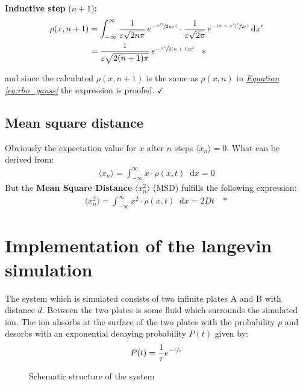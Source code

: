\documentclass[a4paper, parskip=half]{scrartcl}
\newcommand{\effect}[1]{%
	\textbf{#1}%
}
\newcommand{\diff}{\mathop{}\!\mathrm{d}}
\newcommand{\myEqRef}[1]{\textit{\hyperref[eq:#1]{Equation \ref*{eq:#1}}}}
\newcommand{\myEqLabel}[1]{\label{eq:#1}}
\newcommand{\myEqAnnex}[1]{\;\;\;\ast \myEqLabel{#1}}
\begin{document}
\textbf{Inductive step} ($n + 1$)\textbf{:}
\begin{align}
\rho(x,n+1) &= \int_{-\infty}^\infty \frac{1}{\varepsilon\sqrt{2n\pi}}\, e^{-\sfrac{x'^2}{2n\varepsilon^2}} \cdot \frac{1}{\varepsilon\sqrt{2\pi}}\, e^{-\sfrac{(x - x')^2}{2\varepsilon^2}} \diff x'\\
&= \frac{1}{\varepsilon\sqrt{2(n+1)\pi}}\, e^{-\sfrac{x^2}{2(n+1)\varepsilon^2}} \myEqAnnex{gauss_random_walk}
\end{align}

and since the calculated $\rho(x,n+1)$ is the same as $\rho(x,n)$ in \myEqRef{rho_gauss} the expression is proofed. $\checkmark$
\subsection{Mean square distance}
Obviously the expectation value for $x$ after $n$ steps $\langle x_n\rangle = 0$. What can be derived from:
\begin{align}
\langle x_n\rangle = \int_{-\infty}^\infty x \cdot \rho(x,t)\diff x = 0
\end{align}
But the \effect{Mean Square Distance} $\langle x_n^2\rangle$ (MSD) fulfills the following expression:
\begin{align}
\langle x_n^2\rangle = \int_{-\infty}^\infty x^2 \cdot \rho(x,t)\diff x = 2 D t \myEqAnnex{MSD}
\end{align}

\section{Implementation of the langevin simulation}
The system which is simulated consists of two infinite plates A and B with distance $d$. Between the two plates is some fluid which surrounds the simulated ion. The ion absorbs at the surface of the two plates with the probability $p$ and desorbs with an exponential decaying probability $P(t)$ given by:
\begin{align}
P(t) = \frac{1}{\tau}e^{- \sfrac{t}{\tau}}
\end{align}
\begin{figure}[ht!]
\centering
{}
\caption{Schematic structure of the system}
\end{figure}
\end{document}
